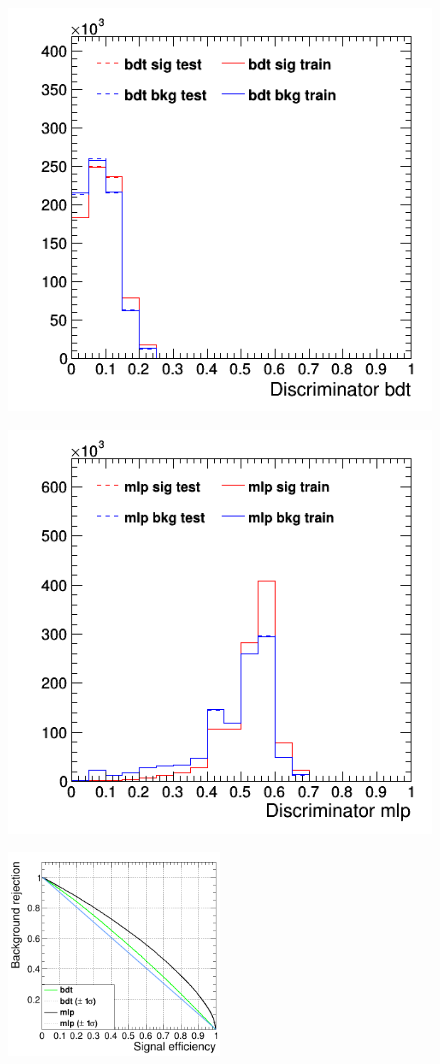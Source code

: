 \documentclass[11pt]{scrartcl}
\begin{document}
	
	\begin{figure}[H]
	\centering
	\begin{minipage}{.5\textwidth}
	  \centering
	  \includegraphics[width=0.75\linewidth]{figures/MVA/select2/config1/discriminator_bdt.png}
	  \label{fig:distr_s2_config1_bdt}
	\end{minipage}%
	\begin{minipage}{.5\textwidth}
	  \centering
	  \includegraphics[width=0.75\linewidth]{figures/MVA/select2/config1/discriminator_mlp.png}
	  \label{fig:distr_s2_config1_mlp}
	\end{minipage}
	\centering
	\includegraphics[width=0.5\textwidth]{figures/MVA/select2/config1/FOM_selection2_nL5_nT400_mD1_nC10.png}

\end{figure}
\end{document}
